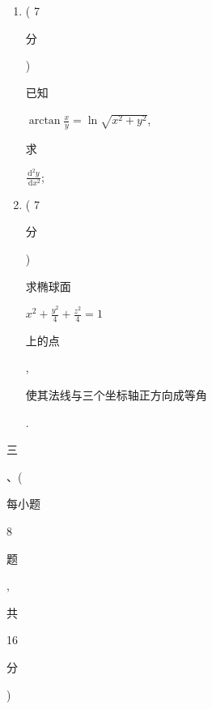 \documentclass[10pt]{article}
\begin{document}
\begin{enumerate}
  \item ( 7 \begin{CJK}{UTF8}{mj}分\end{CJK}) \begin{CJK}{UTF8}{mj}已知\end{CJK} $\arctan \frac{x}{y}=\ln \sqrt{x^{2}+y^{2}}$, \begin{CJK}{UTF8}{mj}求\end{CJK} $\frac{\mathrm{d}^{2} y}{\mathrm{~d} x^{2}}$;

  \item ( 7 \begin{CJK}{UTF8}{mj}分\end{CJK}) \begin{CJK}{UTF8}{mj}求椭球面\end{CJK} $x^{2}+\frac{y^{2}}{4}+\frac{z^{2}}{4}=1$ \begin{CJK}{UTF8}{mj}上的点\end{CJK}, \begin{CJK}{UTF8}{mj}使其法线与三个坐标轴正方向成等角\end{CJK}.

\end{enumerate}
\begin{CJK}{UTF8}{mj}三\end{CJK}、(\begin{CJK}{UTF8}{mj}每小题\end{CJK} 8 \begin{CJK}{UTF8}{mj}题\end{CJK}, \begin{CJK}{UTF8}{mj}共\end{CJK} 16 \begin{CJK}{UTF8}{mj}分\end{CJK})
\end{document}

